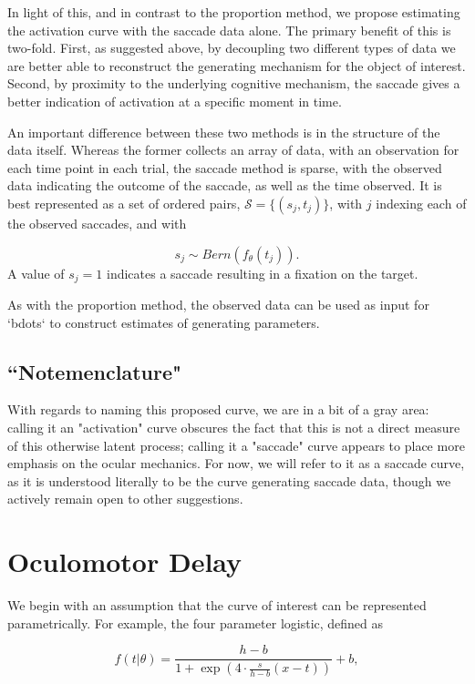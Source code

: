 \documentclass{article}
\begin{document}
In light of this, and in contrast to the proportion method, we propose estimating the activation curve with the saccade data alone. The primary benefit of this is two-fold. First, as suggested above, by decoupling two different types of data we are better able to reconstruct the generating mechanism for the object of interest. Second, by proximity to the underlying cognitive mechanism, the saccade gives a better indication of activation at a specific moment in time.

An important difference between these two methods is in the structure of the data itself. Whereas the former collects an array of data, with an observation for each time point in each trial, the saccade method is sparse, with the observed data indicating the outcome of the saccade, as well as the time observed. It is best represented as a set of ordered pairs, $\mathcal{S} = \{(s_{j}, t_j)\}$, with $j$ indexing each of the observed saccades, and with

$$
s_{j} \sim Bern(f_{\theta}(t_j)).
$$
A value of $s_j = 1$ indicates a saccade resulting in a fixation on the target. 

As with the proportion method, the observed data can be used as input for `bdots` to construct estimates of generating parameters. 

\subsection{``Notemenclature"}

With regards to naming this proposed curve, we are in a bit of a gray area: calling it an "activation" curve obscures the fact that this is not a direct measure of this otherwise latent process; calling it a "saccade" curve appears to place more emphasis on the ocular mechanics. For now, we will refer to it as a saccade curve, as it is understood literally to be the curve generating saccade data, though we actively remain open to other suggestions.

\section{Oculomotor Delay}


We begin with an assumption that the curve of interest can be represented parametrically. For example, the four parameter logistic, defined as

$$
f(t|\theta) = \frac{h-b}{1 + \exp\left(4 \cdot \frac{s}{h-b}(x - t) \right)} +b,
$$ 
\end{document}
